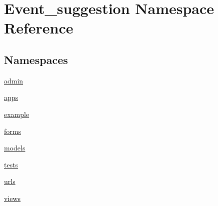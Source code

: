 \hypertarget{namespaceEvent__suggestion}{}\section{Event\+\_\+suggestion Namespace Reference}
\label{namespaceEvent__suggestion}
\subsection*{Namespaces}
\begin{DoxyCompactItemize}
\item 
 \hyperlink{namespaceEvent__suggestion_1_1admin}{admin}
\item 
 \hyperlink{namespaceEvent__suggestion_1_1apps}{apps}
\item 
 \hyperlink{namespaceEvent__suggestion_1_1example}{example}
\item 
 \hyperlink{namespaceEvent__suggestion_1_1forms}{forms}
\item 
 \hyperlink{namespaceEvent__suggestion_1_1models}{models}
\item 
 \hyperlink{namespaceEvent__suggestion_1_1tests}{tests}
\item 
 \hyperlink{namespaceEvent__suggestion_1_1urls}{urls}
\item 
 \hyperlink{namespaceEvent__suggestion_1_1views}{views}
\end{DoxyCompactItemize}
